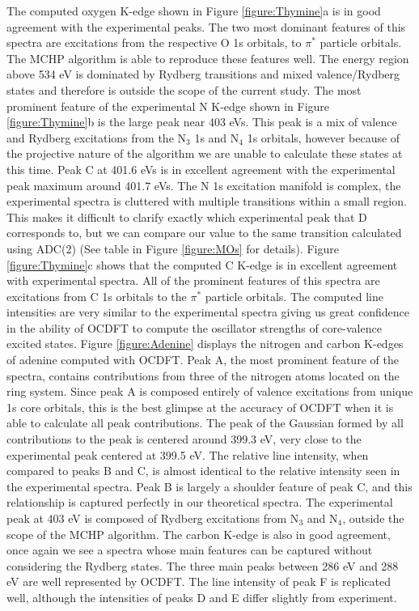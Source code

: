 \documentclass[12pt]{article}
\begin{document}
\noindent The computed oxygen K-edge shown in Figure \ref{figure:Thymine}a is in good agreement with the experimental peaks. The two most dominant features of this spectra are excitations from the respective O 1s orbitals, to $\pi^*$ particle orbitals. The MCHP algorithm is able to reproduce these features well. The energy region above 534 eV is dominated by Rydberg transitions and mixed valence/Rydberg states and therefore is outside the scope of the current study. The most prominent feature of the experimental N K-edge shown in Figure \ref{figure:Thymine}b is the large peak near 403 eVs. This peak is a mix of valence and Rydberg excitations from the N$_3$ 1s and N$_4$ 1s orbitals, however because of the projective nature of the algorithm we are unable to calculate these states at this time. Peak C at 401.6 eVs is in excellent agreement with the experimental peak maximum around 401.7 eVs. The N 1s excitation manifold is complex, the experimental spectra is cluttered with multiple transitions within a small region. This makes it difficult to clarify exactly which experimental peak that D corresponds to, but we can compare our value to the same transition calculated using ADC(2) (See table in Figure \ref{figure:MOs} for details). Figure \ref{figure:Thymine}c shows that the computed C K-edge is in excellent agreement with experimental spectra. All of the prominent features of this spectra are excitations from C 1s orbitals to the $\pi^*$ particle orbitals. The computed line intensities are very similar to the experimental spectra giving us great confidence in the ability of OCDFT to compute the oscillator strengths of core-valence excited states.
Figure \ref{figure:Adenine} displays the nitrogen and carbon K-edges of adenine computed with OCDFT. Peak A, the most prominent feature of the spectra, contains contributions from three of the nitrogen atoms located on the ring system. Since peak A is composed entirely of valence excitations from unique 1s core orbitals, this is the best glimpse at the accuracy of OCDFT when it is able to calculate all peak contributions. The peak of the Gaussian formed by all contributions to the peak is centered around 399.3 eV, very close to the experimental peak centered at 399.5 eV. The relative line intensity, when compared to peaks B and C, is almost identical to the relative intensity seen in the experimental spectra. Peak B is largely a shoulder feature of peak C, and this relationship is captured perfectly in our theoretical spectra. The experimental peak at 403 eV is composed of Rydberg excitations from N$_3$ and N$_4$, outside the scope of the MCHP algorithm. The carbon K-edge is also in good agreement, once again we see a spectra whose main features can be captured without considering the Rydberg states. The three main peaks between 286 eV and 288 eV are well represented by OCDFT. The line intensity of peak F is replicated well, although the intensities of peaks D and E differ slightly from experiment. \\
\end{document}
